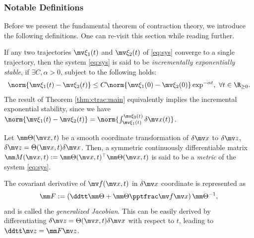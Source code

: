 \subsubsection{Notable Definitions}

Before we present the fundamental theorem of contraction theory, we introduce the following definitions.
One can re-visit this section while reading further.

\begin{definition}  
    If any two trajectories $\mv\xi_1(t)$ and $\mv\xi_2(t)$ of \eqref{eq:sys} converge to a single trajectory, then the system \eqref{eq:sys} is said to be \textit{incrementally exponentially stable}, if $\exists C,\alpha>0$, subject to the following holds:
    \begin{equation}      
        \norm{\mv\xi_1(t)-\mv\xi_2(t)}
        \le 
        C
        \norm{\mv\xi_1(0)-\mv\xi_2(0)}
        \exp^{-\alpha t}
        ,\ \forall t\in\R_{\ge 0}
        .
    \end{equation}
    The result of Theorem \ref{thm:ctrac:main} equivalently implies the incremental exponential stability, since we have $\norm{\mv\xi_1(t)-\mv\xi_2(t)}= \norm{\int_{\mv\xi_1(t)}^{\mv\xi_2(t)}\delta\bdx(t)}$.
    \label{def:inc_exp_stable}
\end{definition}

\begin{definition}
    Let $\mm\Theta(\bdx,t)$ be a smooth coordinate transformation of $\delta\bdx$ to $\delta\bdz$, \ie $\delta\bdz = \Theta(\bdx,t)\delta\bdx$.
    Then, a symmetric continuously differentiable matrix $\mm M(\bdx,t):=\mm\Theta(\bdx,t)^\top\mm\Theta(\bdx,t)$ is said to be a \textit{metric} of the system \eqref{eq:sys}.
    \label{def:metric}
\end{definition}

\begin{definition}
    The covariant derivative of $\mv f(\bdx,t)$ in $\delta\bdx$ coordinate is represented as 
    \begin{equation}
        \mm F
        :=
        \left(
            \ddtt\mm\Theta
            +
            \mm\Theta\tpfpx
        \right)
        \mm\Theta^{-1}
        ,
    \end{equation}
    and is called the \textit{generalized Jacobian}.
    This can be easily derived by differentiating $\delta\bdz = \Theta(\bdx,t)\delta\bdx$ with respect to $t$, leading to $\ddtt\bdz=\mm F\bdz$.
\end{definition}


